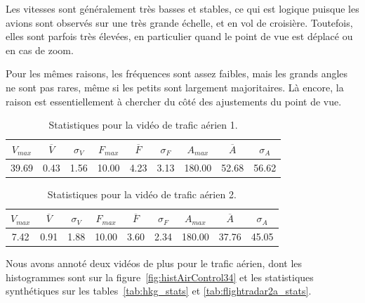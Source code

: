 	Les vitesses sont généralement très basses et stables, ce qui est logique puisque les avions sont observés sur une très grande échelle, et en vol de croisière. Toutefois, elles sont parfois très élevées, en particulier quand le point de vue est déplacé ou en cas de zoom.
	
	Pour les mêmes raisons, les fréquences sont assez faibles, mais les grands angles ne sont pas rares, même si les petits sont largement majoritaires. Là encore, la raison est essentiellement à chercher du côté des ajustements du point de vue.
	
\begin{table}
	\centering
	\begin{tabular}{c c c c c c c c c}
		$V_{max}$	& $\overline{V}$	& $\sigma_{V}$	& $F_{max}$	& $\overline{F}$	& $\sigma_{F}$	& $A_{max}$	& $\overline{A}$	& $\sigma_{A}$	\bigstrut[b] \\ \hline

		39.69		& 0.43				& 1.56			& 10.00		& 4.23				& 3.13			& 180.00	& 52.68				& 56.62			\bigstrut[t] \\
	\end{tabular}
	\caption[Statistiques pour la vidéo de trafic aérien 1]{Statistiques pour la vidéo de trafic aérien 1.}
	\label{tab:mhA_stats}
\end{table}

\begin{table}
	\centering
	\begin{tabular}{c c c c c c c c c}
		$V_{max}$	& $\overline{V}$	& $\sigma_{V}$	& $F_{max}$	& $\overline{F}$	& $\sigma_{F}$	& $A_{max}$	& $\overline{A}$	& $\sigma_{A}$	\bigstrut[b] \\ \hline

		7.42		& 0.91				& 1.88			& 10.00		& 3.60				& 2.34			& 180.00	& 37.76				& 45.05			\bigstrut[t] \\
	\end{tabular}
	\caption[Statistiques pour la vidéo de trafic aérien 2]{Statistiques pour la vidéo de trafic aérien 2.}
	\label{tab:germanwingsA_stats}
\end{table}

	Nous avons annoté deux vidéos de plus pour le trafic aérien, dont les histogrammes sont sur la figure~\ref{fig:histAirControl34} et les statistiques synthétiques sur les tables~\ref{tab:hkg_stats} et \ref{tab:flightradar2a_stats}.
	
